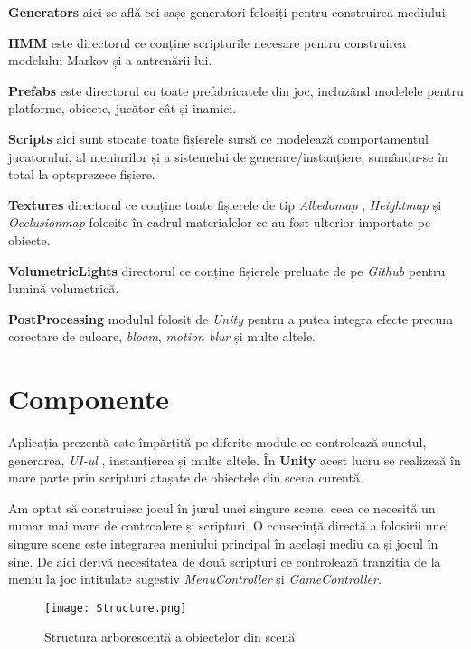 \textbf{Generators} aici se află cei sașe generatori folosiți pentru construirea mediului.\par

\textbf{HMM} este directorul ce conține scripturile necesare pentru construirea modelului Markov și a antrenării lui.\par

\textbf{Prefabs} este directorul cu toate prefabricatele din joc, incluzând modelele pentru platforme, obiecte, jucător cât și inamici.

\textbf{Scripts} aici sunt stocate toate fișierele sursă ce modelează comportamentul jucatorului, al meniurilor și a sistemelui de generare/instanțiere, sumându-se în total la optsprezece fișiere.\par

\textbf{Textures} directorul ce conține toate fișierele de tip \textit{Albedomap} , \textit{Heightmap} și \textit{Occlusionmap} folosite în cadrul materialelor ce au fost ulterior importate pe obiecte.\par

\textbf{VolumetricLights} directorul ce conține fișierele preluate de pe \textit{Github} pentru lumină volumetrică.\par

\textbf{PostProcessing} modulul folosit de \textit{Unity} pentru a putea integra efecte precum corectare de culoare, \textit{bloom}, \textit{motion blur} și multe altele.\par


\section{Componente}
Aplicația prezentă este împărțită pe diferite module ce controlează sunetul, generarea, \textit{UI-ul} , instanțierea și multe altele. În \textbf{Unity} acest lucru se realizeză în mare parte prin scripturi atașate de obiectele din scena curentă. \par

Am optat să construiesc jocul în jurul unei singure scene, ceea ce necesită un numar mai mare de controalere și scripturi. O consecință directă a folosirii unei singure scene este integrarea meniului principal în același mediu ca și jocul în sine. De aici derivă necesitatea de două scripturi ce controlează tranziția de la meniu la joc intitulate sugestiv \textit{MenuController} și \textit{GameController}.\par


\begin{figure}[H]
\centering
\texttt{[image: Structure.png]} \par
\caption{Structura arborescentă a obiectelor din scenă}
\end{figure}

